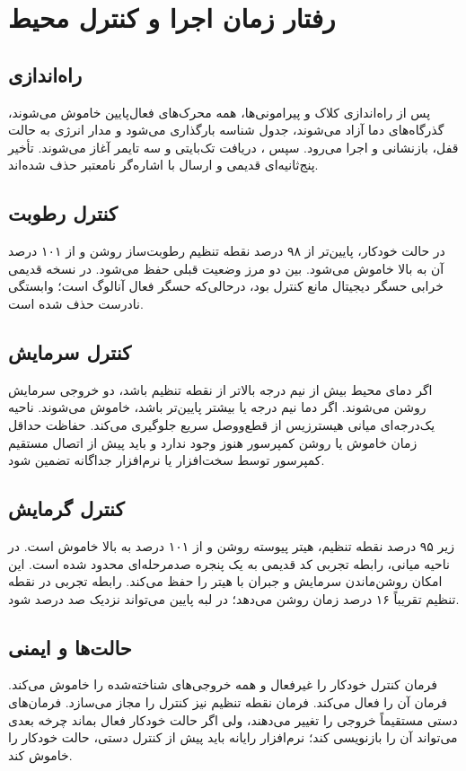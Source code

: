 \chapter{رفتار زمان اجرا و کنترل محیط}

\section{راه‌اندازی}
پس از راه‌اندازی کلاک و پیرامونی‌ها، همه محرک‌های فعال‌پایین خاموش می‌شوند، گذرگاه‌های دما آزاد می‌شوند، جدول شناسه بارگذاری می‌شود و مدار انرژی به حالت  قفل، بازنشانی و اجرا می‌رود. سپس ، دریافت تک‌بایتی  و سه تایمر آغاز می‌شوند. تأخیر پنج‌ثانیه‌ای قدیمی و ارسال  با اشاره‌گر نامعتبر حذف شده‌اند.

\section{کنترل رطوبت}
در حالت خودکار، پایین‌تر از ۹۸ درصد نقطه تنظیم رطوبت‌ساز روشن و از ۱۰۱ درصد آن به بالا خاموش می‌شود. بین دو مرز وضعیت قبلی حفظ می‌شود. در نسخه قدیمی خرابی حسگر دیجیتال مانع کنترل بود، درحالی‌که حسگر فعال آنالوگ است؛ وابستگی نادرست حذف شده است.

\section{کنترل سرمایش}
اگر دمای محیط بیش از نیم درجه بالاتر از نقطه تنظیم باشد، دو خروجی سرمایش روشن می‌شوند. اگر دما نیم درجه یا بیشتر پایین‌تر باشد، خاموش می‌شوند. ناحیه یک‌درجه‌ای میانی هیسترزیس از قطع‌و‌وصل سریع جلوگیری می‌کند. حفاظت حداقل زمان خاموش یا روشن کمپرسور هنوز وجود ندارد و باید پیش از اتصال مستقیم کمپرسور توسط سخت‌افزار یا نرم‌افزار جداگانه تضمین شود.

\section{کنترل گرمایش}
زیر ۹۵ درصد نقطه تنظیم، هیتر پیوسته روشن و از ۱۰۱ درصد به بالا خاموش است. در ناحیه میانی، رابطه تجربی کد قدیمی به یک پنجره صدمرحله‌ای محدود شده است. این امکان روشن‌ماندن سرمایش و جبران با هیتر را حفظ می‌کند. رابطه تجربی در نقطه تنظیم تقریباً ۱۶ درصد زمان روشن می‌دهد؛ در لبه پایین می‌تواند نزدیک صد درصد شود.

\section{حالت‌ها و ایمنی}
فرمان
کنترل خودکار را غیرفعال و همه خروجی‌های شناخته‌شده را خاموش می‌کند. فرمان
آن را فعال می‌کند. فرمان نقطه تنظیم نیز کنترل را مجاز می‌سازد. فرمان‌های دستی مستقیماً خروجی را تغییر می‌دهند، ولی اگر حالت خودکار فعال بماند چرخه بعدی می‌تواند آن را بازنویسی کند؛ نرم‌افزار رایانه باید پیش از کنترل دستی، حالت خودکار را خاموش کند.

